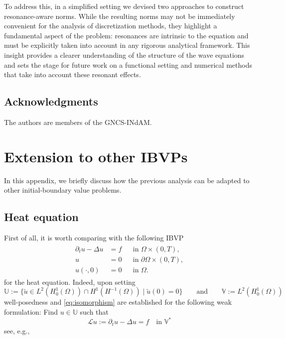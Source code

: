 \documentclass{amsart}
\theoremstyle{plain}
\theoremstyle{remark}
\numberwithin{equation}{section}
\numberwithin{theorem}{section}
\newcommand{\trial}{\mathbb{U}}
\newcommand{\test}{\mathbb{V}}
\newcommand{\data}{\mathbb{V}^*}
\begin{document}
To address this, in a simplified setting we devised two approaches to construct resonance-aware norms. While the resulting norms may not be immediately convenient for the analysis of discretization methods, they highlight a fundamental aspect of the problem: resonances are intrinsic to the equation and must be explicitly taken into account in any rigorous analytical framework. This insight provides a clearer understanding of the structure of the wave equations and sets the stage for future work on a functional setting and numerical methods that take into account these resonant effects.

\subsection*{Acknowledgments} {The authors are members of the GNCS-INdAM. }

\appendix

\section{Extension to other IBVPs}
\label{A:extension-other-IBVPs}
In this appendix, we briefly discuss how the previous analysis can be adapted to other initial-boundary value problems.

\subsection{Heat equation}
\label{SS:Heat equation}
First of all, it is worth comparing with the following IBVP
\begin{equation*}
	\label{eq:heat}
	\begin{aligned}
		\begin{aligned}
			\partial_t u - \Delta u & = f && \text{in } \Omega \times (0,T), \\
			u & = 0 && \text{in } \partial\Omega \times (0,T), \\
			u(\cdot,0) & = 0 && \text{in } \Omega.
		\end{aligned}
	\end{aligned}
\end{equation*}
for the heat equation. Indeed, upon setting
\begin{equation*}
\trial := \{\widetilde{u} \in L^2(H^1_0(\Omega)) \cap H^1(H^{-1}(\Omega)) \mid \widetilde u(0) = 0\}
\qquad \text{and} \qquad
\test := L^2(H^1_0(\Omega))
\end{equation*}
well-posedness and \eqref{eq:isomorphism} are established for the following weak formulation:
Find $u \in \trial$ such that
\begin{equation}
	\label{eq:heat-weak}
	\mathcal{L} u := \partial_{t} u - \Delta u = f \quad \text{in $\data$}
\end{equation}
see, e.g., \cite[Section 65]{Ern.Guermond:21-III}
\end{document}
